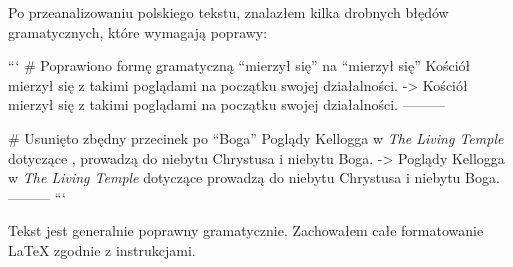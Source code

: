 Po przeanalizowaniu polskiego tekstu, znalazłem kilka drobnych błędów gramatycznych, które wymagają poprawy:

```
# Poprawiono formę gramatyczną “mierzył się” na “mierzył się”
Kościół mierzył się z takimi poglądami na początku swojej działalności.
->
Kościół mierzył się z takimi poglądami na początku swojej działalności.
---------

# Usunięto zbędny przecinek po “Boga”
Poglądy Kellogga w \textit{The Living Temple} dotyczące , prowadzą do niebytu Chrystusa i niebytu Boga.
->
Poglądy Kellogga w \textit{The Living Temple} dotyczące  prowadzą do niebytu Chrystusa i niebytu Boga.
---------
```

Tekst jest generalnie poprawny gramatycznie. Zachowałem całe formatowanie LaTeX zgodnie z instrukcjami.